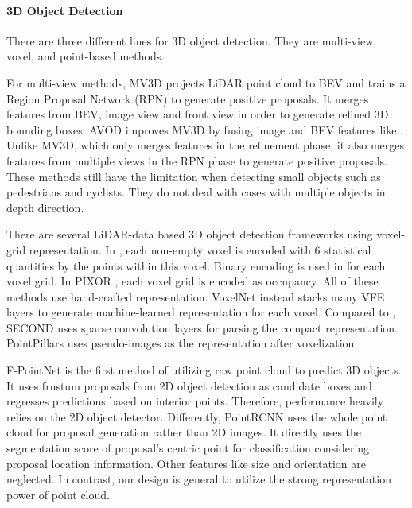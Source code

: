 \documentclass[10pt,twocolumn,letterpaper]{article}
\begin{document}
\vspace{-0.05in}
\paragraph{3D Object Detection} There are three different lines for 3D object detection. They are multi-view, voxel, and point-based methods.

For multi-view methods, MV3D \cite{MV3D} projects LiDAR point cloud to BEV and trains a Region Proposal Network (RPN) to generate positive proposals. It merges features from BEV, image view and front view in order to generate refined 3D bounding boxes. AVOD \cite{AVOD} improves MV3D by fusing image and BEV features like \cite{FPN}. Unlike MV3D, which only merges features in the refinement phase, it also merges features from multiple views in the RPN phase to generate positive proposals. These methods still have the limitation when detecting small objects such as pedestrians and cyclists. They do not deal with cases with multiple objects in depth direction.

There are several LiDAR-data based 3D object detection frameworks using voxel-grid representation. In \cite{VotetoVote}, each non-empty voxel is encoded with 6 statistical quantities by the points within this voxel. Binary encoding is used in \cite{FullyConvolutionNetworkForVehicle} for each voxel grid. In PIXOR \cite{YangLU18}, each voxel grid is encoded as occupancy.  All of these methods use hand-crafted representation. VoxelNet \cite{VOXELNET} instead stacks many VFE layers to generate machine-learned representation for each voxel. Compared to \cite{VOXELNET}, SECOND \cite{yan2018second} uses sparse convolution layers \cite{sparseconv} for parsing the compact representation. PointPillars \cite{lang2018pointpillars} uses pseudo-images as the representation after voxelization.

F-PointNet \cite{FPOINTNET} is the first method of utilizing raw point cloud to predict 3D objects. It uses frustum proposals from 2D object detection as candidate boxes and regresses predictions based on interior points. Therefore, performance heavily relies on the 2D object detector. Differently, PointRCNN \cite{shi2018pointrcnn} uses the whole point cloud for proposal generation rather than 2D images. It directly uses the segmentation score of proposal's centric point for classification considering proposal location information. Other features like size and orientation are neglected. In contrast, our design is general to utilize the strong representation power of point cloud. 
\end{document}
